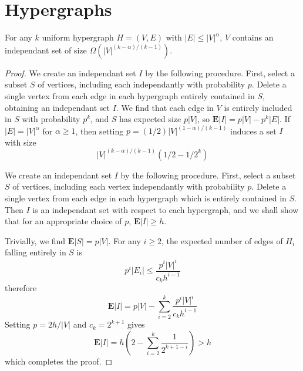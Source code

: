 \section{Hypergraphs}

\begin{lemma}[Tur\'{a}n]
    For any $k$ uniform hypergraph $H = (V,E)$ with $|E| \leq |V|^\alpha$, $V$ contains an independant set of size $\Omega(|V|^{(k-\alpha)/(k-1)})$.
\end{lemma}
\begin{proof}
    We create an independant set $I$ by the following procedure. First, select a subset $S$ of vertices, including each independantly with probability $p$. Delete a single vertex from each edge in each hypergraph entirely contained in $S$, obtaining an independant set $I$. We find that each edge in $V$ is entirely included in $S$ with probability $p^k$, and $S$ has expected size $p |V|$, so $\mathbf{E}|I| = p |V| - p^k |E|$. If $|E| = |V|^\alpha$ for $\alpha \geq 1$, then setting $p = (1/2) |V|^{(1 - \alpha)/(k-1)}$ induces a set $I$ with size
    \[ |V|^{(k - \alpha)/(k-1)}(1/2 - 1/2^k) \]

    We create an independant set $I$ by the following procedure. First, select a subset $S$ of vertices, including each vertex independantly with probability $p$. Delete a single vertex from each edge in each hypergraph which is entirely contained in $S$. Then $I$ is an independant set with respect to each hypergraph, and we shall show that for an appropriate choice of $p$, $\mathbf{E} |I| \geq h$.

    Trivially, we find $\mathbf{E}|S| = p |V|$. For any $i \geq 2$, the expected number of edges of $H_i$ falling entirely in $S$ is
    \[ p^i |E_i| \leq \frac{p^i |V|^i}{c_k h^{i-1}} \]
    therefore
    \[ \mathbf{E}|I| = p|V| - \sum_{i = 2}^k \frac{p^i |V|^i}{c_k h^{i-1}} \]
    Setting $p = 2h/|V|$ and $c_k = 2^{k+1}$ gives
    \[ \mathbf{E}|I| = h \left( 2 - \sum_{i = 2}^k \frac{1}{2^{k+1-i}} \right) > h \]
    which completes the proof.
\end{proof}